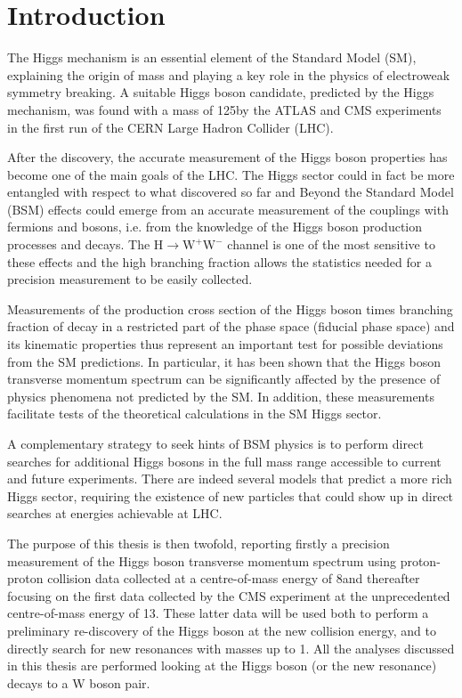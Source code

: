 \chapter*{Introduction}
\thispagestyle{empty}

The Higgs mechanism is an essential element of the Standard Model (SM), explaining the origin of mass and playing a key role in the physics of electroweak symmetry breaking. A suitable Higgs boson candidate, predicted by the Higgs mechanism, was found with a mass of 125\GeV by the ATLAS and CMS experiments in the first run of the CERN Large Hadron Collider (LHC).

After the discovery, the accurate measurement of the Higgs boson properties has become one of the main goals of the LHC. The Higgs sector could in fact be more entangled with respect to what discovered so far and Beyond the Standard Model (BSM) effects could emerge from an accurate measurement of the couplings with fermions and bosons, i.e. from the knowledge of the Higgs boson production processes and decays. The $\mathrm{H \to W^+W^-}$ channel is one of the most sensitive to these effects and the high branching fraction allows the statistics needed for a precision measurement to be easily collected.

Measurements of the production cross section of the Higgs boson times branching fraction of decay in a restricted part of the phase space (fiducial phase space) and its kinematic properties thus represent an important test for possible deviations from the SM predictions.
In particular, it has been shown that the Higgs boson transverse momentum spectrum can be significantly affected by the presence of physics phenomena not predicted by the SM. In addition, these measurements facilitate tests of the theoretical calculations in the SM Higgs sector.

A complementary strategy to seek hints of BSM physics is to perform direct searches for additional Higgs bosons in the full mass range accessible to current and future experiments. There are indeed several models that predict a more rich Higgs sector, requiring the existence of new particles that could show up in direct searches at energies achievable at LHC.

The purpose of this thesis is then twofold, reporting firstly a precision measurement of the Higgs boson transverse momentum spectrum using proton-proton collision data collected at a centre-of-mass energy of 8\TeV and thereafter focusing on the first data collected by the CMS experiment at the unprecedented centre-of-mass energy of 13\TeV. These latter data will be used both to perform a preliminary re-discovery of the Higgs boson at the new collision energy, and to directly search for new resonances with masses up to 1\TeV. All the analyses discussed in this thesis are performed looking at the Higgs boson (or the new resonance) decays to a W boson pair.


